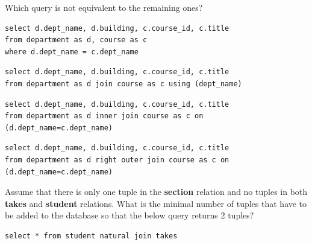 \documentclass[12pt, addpoints, answers]{exam}
\begin{document}
\begin{questions}
\begin{minipage}{\linewidth}
\question[4]
Which query is not equivalent to the remaining ones?\par\vspace{0.5em}
\begin{checkboxes} 
    \choice \begin{verbatim}
select d.dept_name, d.building, c.course_id, c.title
from department as d, course as c
where d.dept_name = c.dept_name
    \end{verbatim}
    \choice \begin{verbatim}
select d.dept_name, d.building, c.course_id, c.title
from department as d join course as c using (dept_name)
    \end{verbatim}
    \choice \begin{verbatim}
select d.dept_name, d.building, c.course_id, c.title
from department as d inner join course as c on (d.dept_name=c.dept_name)
    \end{verbatim}
    \CorrectChoice \begin{verbatim}
select d.dept_name, d.building, c.course_id, c.title
from department as d right outer join course as c on (d.dept_name=c.dept_name)
    \end{verbatim}
\end{checkboxes}
\end{minipage}\vspace{1em}

\begin{minipage}{\linewidth}
\question[4]
Assume that there is only one tuple in the \textbf{section} relation and no tuples in both \textbf{takes} and \textbf{student} relations. 
What is the minimal number of tuples that have to be added to the database so that the below query returns 2 tuples?\par\vspace{0.5em}
\begin{verbatim}
select * from student natural join takes
\end{verbatim}
\begin{checkboxes} 
\end{checkboxes}
\end{minipage}\vspace{1em}


\end{questions}
\end{document}
